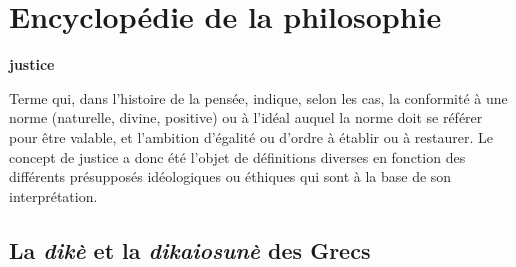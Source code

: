 
\section{Encyclopédie de la philosophie}
%
{\bf justice}

\vspace{.7cm}
Terme qui, dans l’histoire de la
pensée, indique, selon les cas, la conformité à une norme (naturelle, divine, positive) ou à l'idéal auquel la norme doit se
référer pour être valable, et l’ambition
d'égalité ou d’ordre à établir ou à restaurer. Le concept de justice a donc été l’objet de définitions diverses en fonction des
différents présupposés idéologiques ou
éthiques qui sont à la base de son interprétation.

\subsection{La {\it dikè} et la {\it dikaiosunè} des Grecs}


